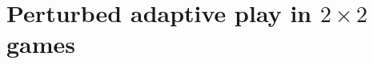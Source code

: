 \documentclass[11.5pt]{article}
\begin{document}

\section{Perturbed adaptive play in $2 \times 2$ games}
\end{document}
